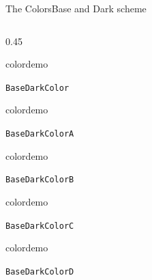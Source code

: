 \documentclass[final]{beamer}
\begin{document}
\begin{frame}{The Colors}{Base and Dark scheme}
\begin{columns}
\begin{column}{0.45\textwidth}
\begin{beamercolorbox}[dp=0pt,sep=0em,wd=\bwidth,ht=10cm]{}
\begin{beamercolorbox}[sep=0em,wd=2cm,ht=2cm]{colordemo}
        \end{beamercolorbox}\quad\texttt{BaseDarkColor}\newline%
        \begin{beamercolorbox}[sep=0em,wd=2cm,ht=2cm]{colordemo}
        \end{beamercolorbox}\quad\texttt{BaseDarkColorA}\hfill\newline%
        \begin{beamercolorbox}[sep=0em,wd=2cm,ht=2cm]{colordemo}%
        \end{beamercolorbox}\quad\texttt{BaseDarkColorB}\hfill\newline%
        \begin{beamercolorbox}[sep=0em,wd=2cm,ht=2cm]{colordemo}%
        \end{beamercolorbox}\quad\texttt{BaseDarkColorC}\hfill\newline%
        \begin{beamercolorbox}[sep=0em,wd=2cm,ht=2cm]{colordemo}%
        \end{beamercolorbox}\quad\texttt{BaseDarkColorD}%
      \end{beamercolorbox}%
    \end{column}
  \end{columns}
\end{frame}
%
%
%
%
%
\end{document}
